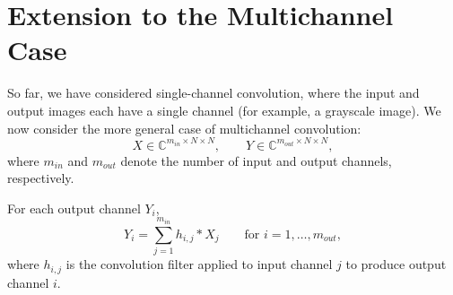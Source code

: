 \section{Extension to the Multichannel Case}

So far, we have considered single-channel convolution, where the input
and output images each have a single channel (for example, a grayscale image).
We now consider the more general case of multichannel convolution:
\[
    X \in\mathbb{C}^{m_{in} \times N \times N}, \qquad Y \in\mathbb{C}^{m_{out} \times N \times N},
\]
where $m_{in}$ and $m_{out}$ denote the number of input and output channels, respectively.

For each output channel $Y_i$,
\begin{equation}
    Y_i = \sum_{j=1}^{m_{in}} h_{i,j} * X_j \qquad\text{for } i=1,\dots,m_{out},
    \label{eq:conv_multi}
\end{equation}
where $h_{i,j}$ is the convolution filter applied to input channel $j$ to produce output channel $i$.

        




